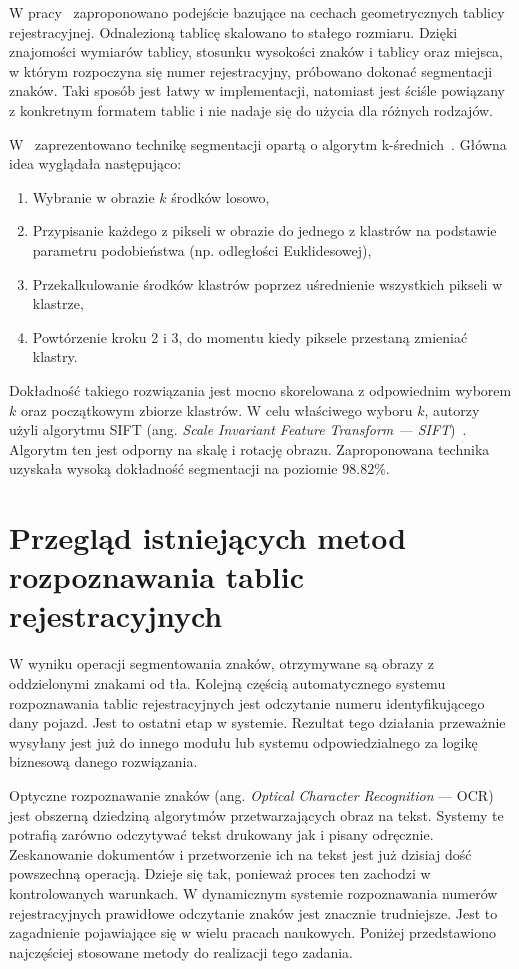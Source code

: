 W pracy~\cite{1381137} zaproponowano podejście bazujące na cechach geometrycznych tablicy rejestracyjnej.
Odnalezioną tablicę skalowano to stałego rozmiaru.
Dzięki znajomości wymiarów tablicy, stosunku wysokości znaków i tablicy oraz miejsca, w którym rozpoczyna się numer rejestracyjny, próbowano dokonać segmentacji znaków.
Taki sposób jest łatwy w implementacji, natomiast jest ściśle powiązany z konkretnym formatem tablic i nie nadaje się do użycia dla różnych rodzajów.

W~\cite{segmentation_kmeans} zaprezentowano technikę segmentacji opartą o algorytm k-średnich~\cite{1017616}.
Główna idea wyglądała następująco:
\begin{enumerate}
    \item Wybranie w obrazie $k$ środków losowo,
    \item Przypisanie każdego z pikseli w obrazie do jednego z klastrów na podstawie parametru podobieństwa (np. odległości Euklidesowej),
    \item Przekalkulowanie środków klastrów poprzez uśrednienie wszystkich pikseli w klastrze,
    \item Powtórzenie kroku 2 i 3, do momentu kiedy piksele przestaną zmieniać klastry.
\end{enumerate}
Dokładność takiego rozwiązania jest mocno skorelowana z odpowiednim wyborem $k$ oraz początkowym zbiorze klastrów.
W celu właściwego wyboru $k$, autorzy użyli algorytmu SIFT (ang. \textit{Scale Invariant Feature Transform --- SIFT})~\cite{sift}.
Algorytm ten jest odporny na skalę i rotację obrazu.
Zaproponowana technika uzyskała wysoką dokładność segmentacji na poziomie $98.82\%$.


\section{Przegląd istniejących metod rozpoznawania tablic rejestracyjnych}
W wyniku operacji segmentowania znaków, otrzymywane są obrazy z oddzielonymi znakami od tła.
Kolejną częścią automatycznego systemu rozpoznawania tablic rejestracyjnych jest odczytanie numeru identyfikującego dany pojazd.
Jest to ostatni etap w systemie.
Rezultat tego działania przeważnie wysyłany jest już do innego modułu lub systemu odpowiedzialnego za logikę biznesową danego rozwiązania.

Optyczne rozpoznawanie znaków (ang. \textit{Optical Character Recognition} --- OCR) jest obszerną dziedziną algorytmów przetwarzających obraz na tekst.
Systemy te potrafią zarówno odczytywać tekst drukowany jak i pisany odręcznie.
Zeskanowanie dokumentów i przetworzenie ich na tekst jest już dzisiaj dość powszechną operacją.
Dzieje się tak, ponieważ proces ten zachodzi w kontrolowanych warunkach.
W dynamicznym systemie rozpoznawania numerów rejestracyjnych prawidłowe odczytanie znaków jest znacznie trudniejsze.
Jest to zagadnienie pojawiające się w wielu pracach naukowych.
Poniżej przedstawiono najczęściej stosowane metody do realizacji tego zadania.

